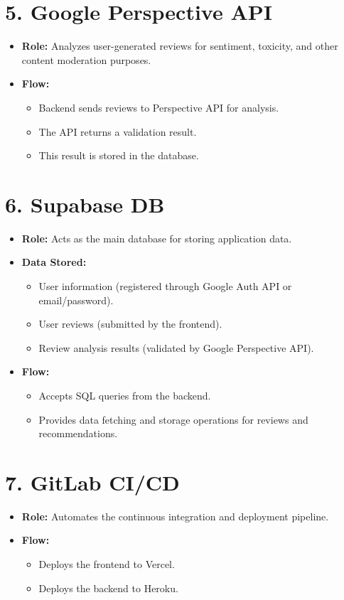 \documentclass[a4paper,12pt]{article}
\begin{document}
\section*{5. Google Perspective API}
\begin{itemize}[leftmargin=*]
  \item \textbf{Role:} Analyzes user-generated reviews for sentiment, toxicity, and other content moderation purposes.
  \item \textbf{Flow:}
    \begin{itemize}
        \item Backend sends reviews to Perspective API for analysis.
        \item The API returns a validation result.
        \item This result is stored in the database.
    \end{itemize}
\end{itemize}

\section*{6. Supabase DB}
\begin{itemize}[leftmargin=*]
  \item \textbf{Role:} Acts as the main database for storing application data.
  \item \textbf{Data Stored:}
    \begin{itemize}
        \item User information (registered through Google Auth API or email/password).
        \item User reviews (submitted by the frontend).
        \item Review analysis results (validated by Google Perspective API).
    \end{itemize}
  \item \textbf{Flow:}
    \begin{itemize}
        \item Accepts SQL queries from the backend.
        \item Provides data fetching and storage operations for reviews and recommendations.
    \end{itemize}
\end{itemize}

\section*{7. GitLab CI/CD}
\begin{itemize}[leftmargin=*]
  \item \textbf{Role:} Automates the continuous integration and deployment pipeline.
  \item \textbf{Flow:}
    \begin{itemize}
        \item Deploys the frontend to Vercel.
        \item Deploys the backend to Heroku.
    \end{itemize}
\end{itemize}
\end{document}

